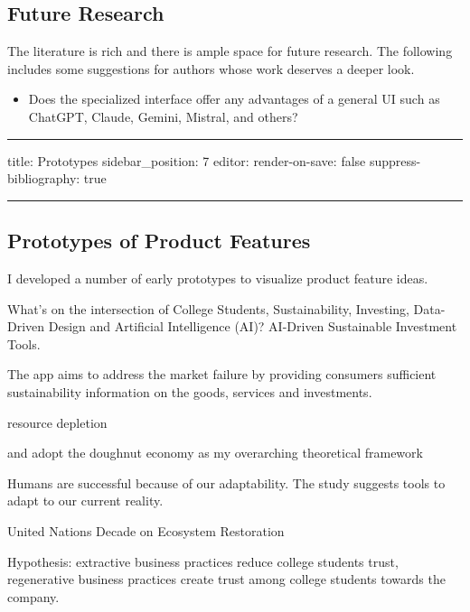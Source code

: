\documentclass[
  letterpaper,
  DIV=11,
  numbers=noendperiod]{scrartcl}
\providecommand{\tightlist}{%
  \setlength{\itemsep}{0pt}\setlength{\parskip}{0pt}}\usepackage{longtable,booktabs,array}
\begin{document}
\subsection{Future Research}\label{future-research}

The literature is rich and there is ample space for future research. The
following includes some suggestions for authors whose work deserves a
deeper look.

\begin{itemize}
\tightlist
\item
  Does the specialized interface offer any advantages of a general UI
  such as ChatGPT, Claude, Gemini, Mistral, and others?
\end{itemize}

\newpage

\begin{center}\rule{0.5\linewidth}{0.5pt}\end{center}

title: Prototypes sidebar\_position: 7 editor: render-on-save: false
suppress-bibliography: true

\begin{center}\rule{0.5\linewidth}{0.5pt}\end{center}

\subsection{Prototypes of Product
Features}\label{prototypes-of-product-features}

I developed a number of early prototypes to visualize product feature
ideas.

What's on the intersection of College Students, Sustainability,
Investing, Data-Driven Design and Artificial Intelligence (AI)?
AI-Driven Sustainable Investment Tools.

The app aims to address the market failure by providing consumers
sufficient sustainability information on the goods, services and
investments.

resource depletion

and adopt the doughnut economy as my overarching theoretical framework

Humans are successful because of our adaptability. The study suggests
tools to adapt to our current reality.

United Nations Decade on Ecosystem Restoration

Hypothesis: extractive business practices reduce college students trust,
regenerative business practices create trust among college students
towards the company.
\end{document}
